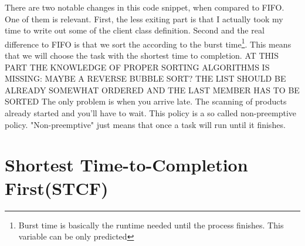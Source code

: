 \documentclass{report}
\newcounter{defi}[section]\setcounter{defi}{0}
\begin{document}
There are two notable changes in this code snippet, when compared to FIFO. One of them is relevant.
First, the less exiting part is that I actually took my time to write out some of the client class definition.
Second and the real difference to FIFO is that we sort the according to the burst time\footnote{Burst time is basically the runtime needed until the process finishes. This variable can be only predicted}. 
This means that we will choose the task with the shortest time to completion.
AT THIS PART THE KNOWLEDGE OF PROPER SORTING ALGORITHMS IS MISSING: MAYBE A REVERSE BUBBLE SORT? 
THE LIST SHOULD BE ALREADY SOMEWHAT ORDERED AND THE LAST MEMBER HAS TO BE SORTED
The only problem is when you arrive late. The scanning of products already started and you'll have to wait.
This policy is a so called non-preemptive policy.
"Non-preemptive" just means that once a task will run until it finishes.


\section{Shortest Time-to-Completion First(STCF)}
\end{document}

